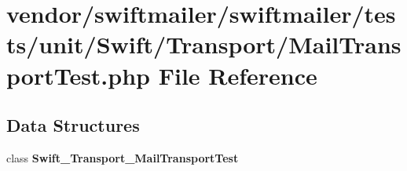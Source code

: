 \section{vendor/swiftmailer/swiftmailer/tests/unit/\+Swift/\+Transport/\+Mail\+Transport\+Test.php File Reference}
\label{_mail_transport_test_8php}
\subsection*{Data Structures}
\begin{DoxyCompactItemize}
\item 
class {\bf Swift\+\_\+\+Transport\+\_\+\+Mail\+Transport\+Test}
\end{DoxyCompactItemize}

